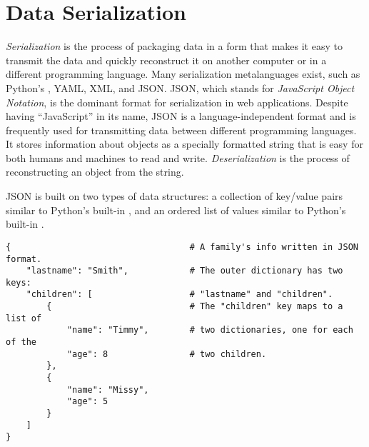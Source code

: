 
\section*{Data Serialization} %

\emph{Serialization} is the process of packaging data in a form that makes it easy to transmit the data and quickly reconstruct it on another computer or in a different programming language.
Many serialization metalanguages exist, such as Python's , YAML, XML, and JSON.
JSON, which stands for \emph{JavaScript Object Notation}, is the dominant format for serialization in web applications.
Despite having ``JavaScript'' in its name, JSON is a language-independent format and is frequently used for transmitting data between different programming languages.
It stores information about objects as a specially formatted string that is easy for both humans and machines to read and write.
\emph{Deserialization} is the process of reconstructing an object from the string.

JSON is built on two types of data structures: a collection of key/value pairs similar to Python's built-in , and an ordered list of values similar to Python's built-in .


%
\begin{lstlisting}
{                                   # A family's info written in JSON format.
    "lastname": "Smith",            # The outer dictionary has two keys:
    "children": [                   # "lastname" and "children".
        {                           # The "children" key maps to a list of
            "name": "Timmy",        # two dictionaries, one for each of the
            "age": 8                # two children.
        },
        {
            "name": "Missy",
            "age": 5
        }
    ]
}
\end{lstlisting}

